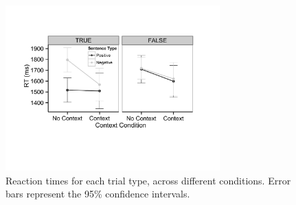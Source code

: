 \documentclass[10pt,letterpaper]{article}
\begin{document}

\begin{figure}
\begin{center} 
\includegraphics[width=3.25in]{figures/study1_linegraph.pdf}
\caption{\label{fig:e1line}Reaction times for each trial type, across different conditions.  Error bars represent the 95\% confidence intervals.}
\end{center} 
\end{figure}
\end{document}
